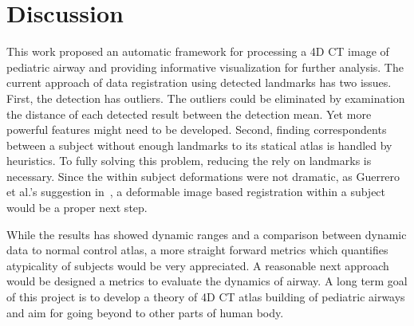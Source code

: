 \section{Discussion}
\label{sec:discussion}
This work proposed an automatic framework for processing a 4D CT image of pediatric airway and providing informative visualization for further analysis.
The current approach of data registration using detected landmarks has two issues.
First, the detection has outliers.
The outliers could be eliminated by examination the distance of each detected result between the detection mean.
Yet more powerful features might need to be developed.
Second, finding correspondents between a subject without enough landmarks to its statical atlas is handled by heuristics.
To fully solving this problem, reducing the rely on landmarks is necessary.
Since the within subject deformations were not dramatic, as Guerrero et al.'s suggestion in~\cite{guerrero2006dynamic}, a deformable image based registration within a subject would be a proper next step.

While the results has showed dynamic ranges and a comparison between dynamic data to normal control atlas, a more straight forward metrics which quantifies atypicality of subjects would be very appreciated.
A reasonable next approach would be designed a metrics to evaluate the dynamics of airway.
A long term goal of this project is to develop a theory of 4D CT atlas building of pediatric airways and aim for going beyond to other parts of human body.